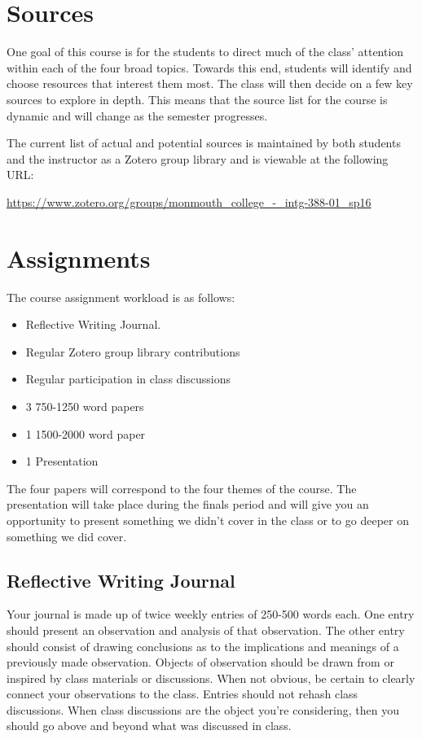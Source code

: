 \documentclass[]{tufte-handout}
\begin{document}
\section{Sources}

One goal of this course is for the students to direct much of the class' attention within each of the four broad topics. Towards this end, students will identify and choose resources that interest them most. The class will then decide on a few key sources to explore in depth. This means that the source list for the course is dynamic and will change as the semester progresses.

The current list of actual and potential sources is maintained by both students and the instructor as a Zotero group library and is viewable at the following URL:
\vspace{.2in}

\begin{footnotesize}
\url{https://www.zotero.org/groups/monmouth_college_-_intg-388-01_sp16}
\end{footnotesize}

 
\section{Assignments}

The course assignment workload is as follows:
\begin{itemize}
\item Reflective Writing Journal. 
\item Regular Zotero group library contributions
\item Regular participation in class discussions
\item 3 750-1250 word papers
\item 1 1500-2000 word paper
\item 1 Presentation 
\end{itemize}
The four papers will correspond to the four themes of the course. The presentation will take place during the finals period and will give you an opportunity to present something we didn't cover in the class or to go deeper on something we did cover.  

\subsection{Reflective Writing Journal}

Your journal is made up of twice weekly entries of 250-500 words each. One entry should present an observation and analysis of that observation. The other entry should consist of drawing conclusions as to the implications and meanings of a previously made observation.  Objects of observation should be drawn from or inspired by class materials or discussions.  When not obvious, be certain to clearly connect your observations to the class. Entries should not rehash class discussions. When class discussions are the object you're considering, then you should go above and beyond what was discussed in class. 
\end{document}
